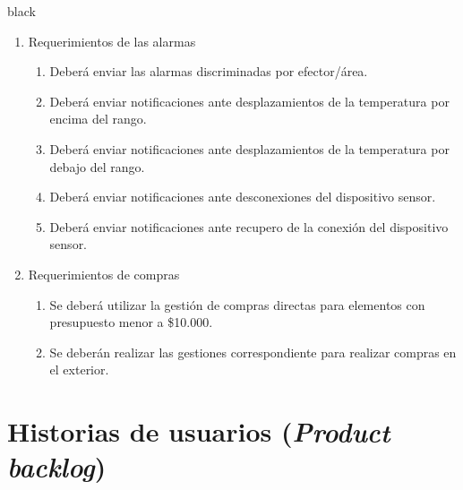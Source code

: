 \documentclass[11pt]{charter}
\begin{document}
\begin{consigna}{black}
\begin{enumerate}
\item Requerimientos de las alarmas
	\begin{enumerate}
	\item Deberá enviar las alarmas discriminadas por efector/área.
	\item Deberá enviar notificaciones ante desplazamientos de la temperatura por encima del rango.
	\item Deberá enviar notificaciones ante desplazamientos de la temperatura por debajo del rango.
	\item Deberá enviar notificaciones ante desconexiones del dispositivo sensor.
	\item Deberá enviar notificaciones ante recupero de la conexión del dispositivo sensor.
	 \end{enumerate}	 

\item Requerimientos de compras
	\begin{enumerate}
	\item Se deberá utilizar la gestión de compras directas para elementos con presupuesto menor a {\$10.000}.
	\item Se deberán realizar las gestiones correspondiente para realizar compras en el exterior.
	\end{enumerate}
	
		
\end{enumerate}


\end{consigna}

\section{Historias de usuarios (\textit{Product backlog})}
\label{sec:backlog}
\end{document}
